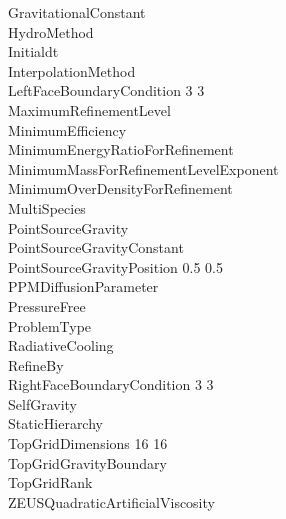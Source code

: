 \documentclass{book}
\begin{document}
{\begin{tabbing}
\> GravitationalConstant              \\
\> HydroMethod                  \\
\> Initialdt                    \\
\> InterpolationMethod                 \\
\> LeftFaceBoundaryCondition   3 3    \\
\> MaximumRefinementLevel         \\
\> MinimumEfficiency            \\
\> MinimumEnergyRatioForRefinement   \\
\> MinimumMassForRefinementLevelExponent  \\
\> MinimumOverDensityForRefinement   \\
\> MultiSpecies                 \\
\> PointSourceGravity          \\
\> PointSourceGravityConstant  \\
\> PointSourceGravityPosition  0.5 0.5 \\
\> PPMDiffusionParameter               \\
\> PressureFree  \\
\> ProblemType                       \\
\> RadiativeCooling             \\
\> RefineBy                       \\
\> RightFaceBoundaryCondition  3 3 \\
\> SelfGravity                        \\
\> StaticHierarchy                \\
\> TopGridDimensions           16 16 \\
\> TopGridGravityBoundary             \\
\> TopGridRank                 \\
\> ZEUSQuadraticArtificialViscosity 
\end{tabbing}}

\subsection{\cello}

\end{document}

